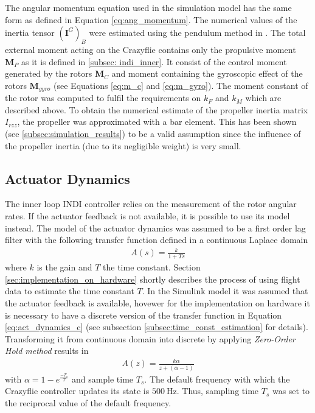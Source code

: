 \documentclass[11pt, a4paper, twoside]{report}
\begin{document}
The angular momentum equation used in the simulation model has the same form as defined in Equation \ref{eq:ang_momentum}. The numerical values of the inertia tensor $(\bm{I}^G)_B$ were estimated using the pendulum method in \cite{foerster}. The total external moment acting on the Crazyflie contains only the propulsive moment $\bm{M}_P$ as it is defined in \ref{subsec: indi_inner}. It consist of the control moment generated by the rotors $\bm{M}_C$  and moment containing the gyroscopic effect of the rotors $\bm{M}_{gyro}$ (see Equations \ref{eq:m_c} and \ref{eq:m_gyro}). The moment constant of the rotor was computed to fulfil the requirements on $k_F$ and $k_M$ which are described above. To obtain the numerical estimate of the propeller inertia matrix $I_{rzz}$, the propeller was approximated with a bar element. This has been shown (see \ref{subsec:simulation_results}) to be a valid assumption since the influence of the propeller inertia (due to its negligible weight) is very small.

\subsection{Actuator Dynamics} \label{subsec:actuator_dynamics}

The inner loop \acrshort{INDI} controller relies on the measurement of the rotor angular rates. If the actuator feedback is not available, it is possible to use its model instead. The model of the actuator dynamics was assumed to be a first order lag filter with the following transfer function defined in a continuous Laplace domain
\begin{equation}
	\begin{split}
		A(s) = \frac{k}{1+Ts}
		\label{eq:act_dynamics_c}
	\end{split}
\end{equation}
where $k$ is the gain and $T$ the time constant. Section \ref{sec:implementation_on_hardware} shortly describes the process of using flight data to estimate the time constant $T$. In the Simulink model it was assumed that the actuator feedback is available, hovewer for the implementation on hardware it is necessary to have a discrete version of the transfer function in Equation \ref{eq:act_dynamics_c} (see subsection \ref{subsec:time_const_estimation} for details). Transforming it from continuous domain into discrete by applying \textit{Zero-Order Hold method} results in
\begin{equation}
	\begin{split}
		A(z) = \frac{k\alpha}{z+(\alpha-1)}
		\label{eq:act_dynamics_d}
	\end{split}
\end{equation}
with $\alpha = 1-e^{\frac{-T_s}{T}}$ and sample time $T_s$. The default frequency with which the Crazyflie controller updates its state is $500~\si{\Hz}$. Thus, sampling time $T_s$ was set to the reciprocal value of the default frequency. 
\end{document}
